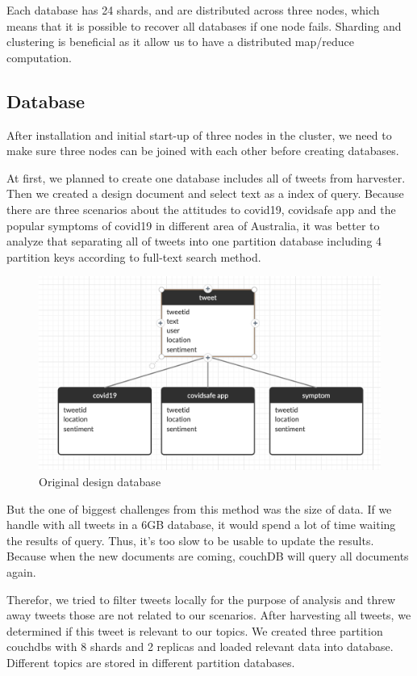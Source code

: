 Each database has 24 shards, and are distributed across three nodes, which means that it is possible to recover all databases if one node fails. Sharding and clustering is beneficial as it allow us to have a distributed map/reduce computation. 


\subsection{Database} 
After installation and initial start-up of three nodes in the cluster, we need to make sure three nodes can be joined with each other before creating databases. 

At first, we planned to create one database includes all of tweets from harvester. Then we created a design document and select text as a index of query. Because there are three scenarios about the attitudes to covid19, covidsafe app and the popular symptoms of covid19 in different area of Australia, it was better to analyze that separating all of tweets into one partition database including 4 partition keys according to full-text search method. 

\begin{figure}[H]
    \centering
    \includegraphics[scale=0.4]{city_analytics/report/images/db1.png}
    \caption{Original design database}
    \label{fig:my_label}
\end{figure}

But the one of biggest challenges from this method was the size of data.  If we handle with all tweets in a 6GB database, it would spend a lot of time waiting the results of query. Thus, it's too slow to be usable to update the results. Because when the new documents are coming, couchDB will query all documents again.

Therefor, we tried to filter tweets locally for the purpose of analysis and threw away tweets those are not related to our scenarios. After harvesting all tweets, we determined if this tweet is relevant to our topics. We created three partition couchdbs with 8 shards and 2 replicas and loaded relevant data into database. Different topics are stored in different partition databases.

